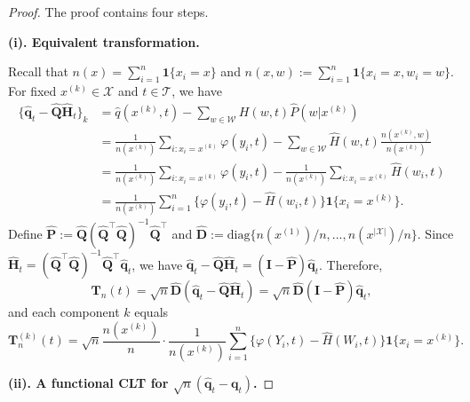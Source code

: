 \documentclass[
  12pt]{article}
\def\D{\mathbf{D}}
\def\H{\mathbf{H}}
\def\I{\mathbf{I}}
\def\P{\mathbf{P}}
\def\Q{\mathbf{Q}}
\def\q{\mathbf{q}}
\def\T{\mathbf{T}}
\def\wh{\widehat}
\def\cT{\mathcal{T}}
\def\cX{\mathcal{X}}
\def\diag{\mbox{diag}}
\begin{document}
\begin{proof}
The proof contains four steps.

\noindent\textbf{(i). Equivalent transformation.}

Recall that $n(x)=\sum_{i=1}^n\mathbf 1\{x_i=x\}$ and $n(x,w):=\sum_{i=1}^n\mathbf 1\{x_i=x,w_i=w\}$. For fixed $x^{(k)}\in\cX$ and $t\in\cT$, we have
\begin{align*}
    \{\wh{\q}_t-\wh{\Q} \wh{\mathbf{H}}_t\}_k&=\wh{q}(x^{(k)},t)- \sum_{w \in \mathcal{W}} H(w, t)\wh{P}(w | x^{(k)}) \\
    &= \frac{1}{n(x^{(k)})} \sum_{i:x_i=x^{(k)}} \varphi(y_i,t)-\sum_{w \in \mathcal{W}} \wh{H}(w, t)\frac{n(x^{(k)},w)}{n(x^{(k)})}\\
    &=\frac{1}{n(x^{(k)})} \sum_{i:x_i=x^{(k)}} \varphi(y_i,t)-\frac{1}{n(x^{(k)})}\sum_{i:x_i=x^{(k)}} \wh{H}(w_i, t)\\
    &=\frac{1}{n(x^{(k)})}\sum_{i=1}^n \{\varphi(y_i,t)- \wh{H}(w_i, t)\}\mathbf{1}\{x_i=x^{(k)}\}.
\end{align*}
Define $\wh{\P}:= \wh{\Q}(\wh{\Q}^\top\wh{\Q})^{-1}\wh{\Q}^\top$ and  $\wh{\D}:=\diag\{n(x^{(1)})/n,...,n(x^{|\mathcal{X}|})/n\}$. Since $\wh{\mathbf{H}}_t = (\wh{\Q}^\top \wh{\Q})^{-1} \wh{\Q}^\top \wh{\q}_t$, we have $\wh{\q}_t-\wh{\Q} \wh{\mathbf{H}}_t=(\I-\wh{\P})\wh{\q}_t$. Therefore,
$$
\T_n(t) = \sqrt{n}\wh{\D}(\wh{\q}_t-\wh{\Q}\wh{\H}_t) =\sqrt{n}\wh{\D}(\I-\wh{\P})\wh{\q}_t, 
$$
and each component $k$ equals
$$
\T_n^{(k)}(t) = \sqrt{n}\frac{n(x^{(k)})}{n}\cdot \frac{1}{n(x^{(k)})}\sum_{i=1}^n\{\varphi(Y_i,t)-\wh{H}(W_i,t)\}\mathbf{1}\{x_i=x^{(k)}\}.
$$

\noindent\textbf{(ii). A functional CLT for $\sqrt{n}(\wh{\q}_t-\q_t)$.}


\end{proof}
\end{document}
